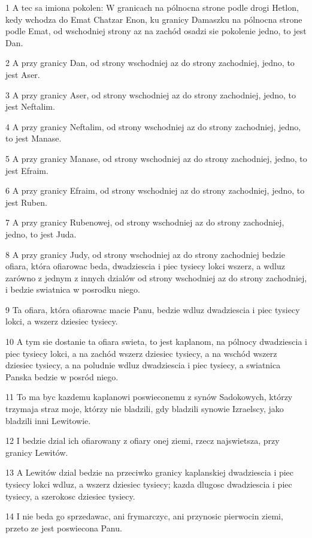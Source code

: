 \par 1 A tec sa imiona pokolen: W granicach na pólnocna strone podle drogi Hetlon, kedy wchodza do Emat Chatzar Enon, ku granicy Damaszku na pólnocna strone podle Emat, od wschodniej strony az na zachód osadzi sie pokolenie jedno, to jest Dan.
\par 2 A przy granicy Dan, od strony wschodniej az do strony zachodniej, jedno, to jest Aser.
\par 3 A przy granicy Aser, od strony wschodniej az do strony zachodniej, jedno, to jest Neftalim.
\par 4 A przy granicy Neftalim, od strony wschodniej az do strony zachodniej, jedno, to jest Manase.
\par 5 A przy granicy Manase, od strony wschodniej az do strony zachodniej, jedno, to jest Efraim.
\par 6 A przy granicy Efraim, od strony wschodniej az do strony zachodniej, jedno, to jest Ruben.
\par 7 A przy granicy Rubenowej, od strony wschodniej az do strony zachodniej, jedno, to jest Juda.
\par 8 A przy granicy Judy, od strony wschodniej az do strony zachodniej bedzie ofiara, która ofiarowac beda, dwadziescia i piec tysiecy lokci wszerz, a wdluz zarówno z jednym z innych dzialów od strony wschodniej az do strony zachodniej, i bedzie swiatnica w posrodku niego.
\par 9 Ta ofiara, która ofiarowac macie Panu, bedzie wdluz dwadziescia i piec tysiecy lokci, a wszerz dziesiec tysiecy.
\par 10 A tym sie dostanie ta ofiara swieta, to jest kaplanom, na pólnocy dwadziescia i piec tysiecy lokci, a na zachód wszerz dziesiec tysiecy, a na wschód wszerz dziesiec tysiecy, a na poludnie wdluz dwadziescia i piec tysiecy, a swiatnica Panska bedzie w posród niego.
\par 11 To ma byc kazdemu kaplanowi poswieconemu z synów Sadokowych, którzy trzymaja straz moje, którzy nie bladzili, gdy bladzili synowie Izraelscy, jako bladzili inni Lewitowie.
\par 12 I bedzie dzial ich ofiarowany z ofiary onej ziemi, rzecz najswietsza, przy granicy Lewitów.
\par 13 A Lewitów dzial bedzie na przeciwko granicy kaplanskiej dwadziescia i piec tysiecy lokci wdluz, a wszerz dziesiec tysiecy; kazda dlugosc dwadziescia i piec tysiecy, a szerokosc dziesiec tysiecy.
\par 14 I nie beda go sprzedawac, ani frymarczyc, ani przynosic pierwocin ziemi, przeto ze jest poswiecona Panu.
